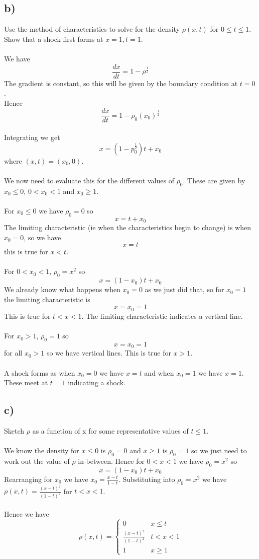 \documentclass[1pt]{article}
\begin{document}
\subsection{b)}
Use the method of characteristics to solve for the density $\rho(x, t)$ for
$0\leq t\leq 1$. Show that a shock first forms at $x = 1 , t = 1$.
\\
\\ We have $$\frac{dx}{dt}=1-\rho^{\frac{1}{2}}$$ The gradient is constant, so this will be given by the boundary condition at $t=0$.
\\ Hence $$\frac{dx}{dt}=1-\rho_0(x_0)^{\frac{1}{2}}$$
\\ Integrating we get $$x=(1-p_0^{\frac{1}{2}})t+x_0$$ where $(x,t)=(x_0,0)$. 
\\ 
\\ We now need to evaluate this for the different values of $\rho_0$. These are given by $x_0\leq 0$, $0<x_0<1$ and $x_0\geq 1$. 
\\
\\ For $x_0\leq 0$ we have $\rho_0=0$ so $$x=t+x_0$$ The limiting characteristic (ie when the characteristics begin to change) is when $x_0=0$, so we have $$x=t$$ this is true for $x<t$.
\\
\\ For $0<x_0<1$, $\rho_0=x^2$ so $$x=(1-x_0)t+x_0$$ We already know what happens when $x_0=0$ as we just did that, so for $x_0=1$ the limiting characteristic is $$x=x_0=1$$ This is true for $t<x<1$. The limiting characteristic indicates a vertical line. 
\\
\\ For $x_0>1$, $\rho_0=1$ so $$x=x_0=1$$ for all $x_0>1$ so we have vertical lines. This is true for $x>1$.
\\
\\ A shock forms as when $x_0=0$ we have $x=t$ and when $x_0=1$ we have $x=1$. These meet at $t=1$ indicating a shock.
\subsection{c)}
Sketch $\rho$ as a function of x for some representative values of $t\leq 1$.
\\
\\ We know the density for $x\leq 0$ is $\rho_0=0$ and $x\geq 1$ is $\rho_0=1$ so we just need to work out the value of $\rho$ in-between. Hence for $0<x<1$ we have $\rho_0=x^2$ so $$x=(1-x_0)t+x_0$$ Rearranging for $x_0$ we have $x_0=\frac{x-t}{1-t}$. Substituting into $\rho_0=x^2$ we have $\rho(x,t)=\frac{(x-t)^2}{(1-t)^2}$ for $t<x<1$.
\\
\\Hence we have $$\rho(x,t)=\begin{cases}
0 & x\leq t \\
\frac{(x-t)^2}{(1-t)^2} & t<x<1 \\
1 & x\geq 1
\end{cases}$$
\end{document}
